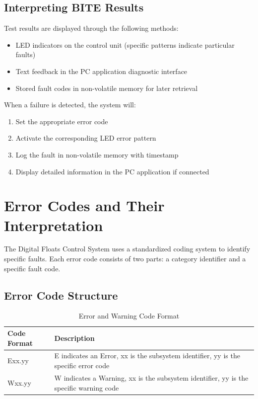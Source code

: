 \documentclass[12pt,a4paper,twoside,openright]{book}
\newcommand{\tabletextfont}{\normalfont\rmfamily}
\newcommand{\tableheadfont}{\normalfont\bfseries}
\begin{document}
\subsection{Interpreting BITE Results}

Test results are displayed through the following methods:

\begin{itemize}
    \item LED indicators on the control unit (specific patterns indicate particular faults)
    \item Text feedback in the PC application diagnostic interface
    \item Stored fault codes in non-volatile memory for later retrieval
\end{itemize}

When a failure is detected, the system will:
\begin{enumerate}
    \item Set the appropriate error code
    \item Activate the corresponding LED error pattern
    \item Log the fault in non-volatile memory with timestamp
    \item Display detailed information in the PC application if connected
\end{enumerate}

\section{Error Codes and Their Interpretation}

The Digital Floats Control System uses a standardized coding system to identify specific faults. Each error code consists of two parts: a category identifier and a specific fault code.

\subsection{Error Code Structure}

\begin{table}[h]
\centering
\setlength{\tabcolsep}{5pt} %
\begin{tabular}{|p{}|p{}|}
\hline
\tableheadfont\textbf{Code Format} & \tableheadfont\textbf{Description} \\
\hline
\tabletextfont Exx.yy & E indicates an Error, xx is the subsystem identifier, yy is the specific error code \\
\hline
\tabletextfont Wxx.yy & W indicates a Warning, xx is the subsystem identifier, yy is the specific warning code \\
\hline
\end{tabular}
\caption{Error and Warning Code Format}
\end{table}
\end{document}
